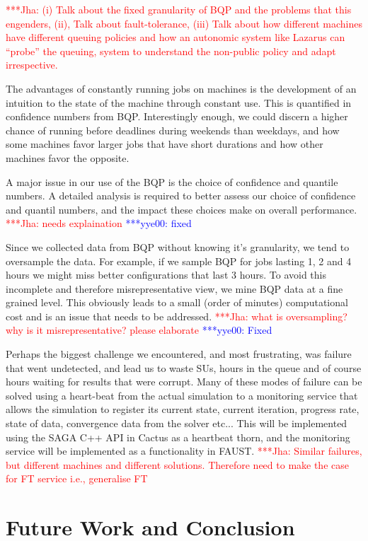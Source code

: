 \documentclass[conference,final]{IEEEtran}
\newcommand{\jhanote}[1]{ {\textcolor{red} { ***Jha: #1 }}}
\newcommand{\yyenote}[1]{ {\textcolor{blue} { ***yye00: #1 }}}
\newcommand{\jhanote}[1]{}
\newcommand{\yyenote}[1]{}
\begin{document}
\jhanote{(i) Talk about the fixed granularity of BQP and the problems
  that this engenders, (ii), Talk about fault-tolerance, (iii) Talk
  about how different machines have different queuing policies and how
  an autonomic system like Lazarus can ``probe'' the queuing, system
  to understand the non-public policy and adapt irrespective.}

The advantages of constantly running jobs on machines is the
development of an intuition to the state of the machine through
constant use. This is quantified in confidence numbers from
BQP. Interestingly enough, we could discern a higher chance of running
before deadlines during weekends than weekdays, and how some machines
favor larger jobs that have short durations and how other machines
favor the opposite.

A major issue in our use of the BQP is the choice of confidence and quantile
numbers. A detailed analysis is required to better assess our choice
of confidence and quantil numbers, and the impact
these choices make on overall performance. \jhanote{needs explaination}\yyenote{fixed}

Since we collected data from BQP without knowing it's granularity, we
tend to oversample the data. For example, if we sample
BQP for jobs lasting 1, 2 and 4 hours we might miss
better configurations that last 3 hours. To avoid this
incomplete and therefore misrepresentative view, we mine
BQP data at a fine grained level. This obviously leads to a small (order of
minutes) computational cost and is an issue that needs to be
addressed. \jhanote{what is oversampling? why is it misrepresentative?
  please elaborate} \yyenote{Fixed}

Perhaps the biggest challenge we encountered, and most frustrating,
was failure that went undetected, and lead us to waste SUs, hours in
the queue and of course hours waiting for results that were
corrupt. Many of these modes of failure can be solved using a
heart-beat from the actual simulation to a monitoring service that
allows the simulation to register its current state, current
iteration, progress rate, state of data, convergence data from the
solver etc... This will be implemented using the SAGA C++ API in
Cactus as a heartbeat thorn, and the monitoring service will be
implemented as a functionality in FAUST.  \jhanote{Similar failures,
  but different machines and different solutions. Therefore need to
  make the case for FT service i.e., generalise FT}


\section{Future Work and Conclusion}
\end{document}
